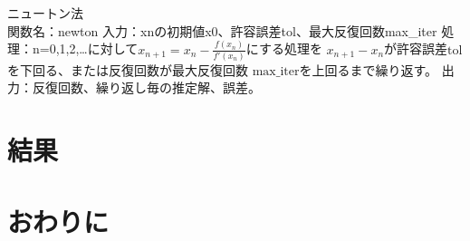 \documentclass[uplatex]{jsarticle}
\begin{document}
ニュートン法\\
関数名：newton 入力：xnの初期値x0、許容誤差tol、最大反復回数max\_iter
処理：n=0,1,2,…に対して\( x_{n+1} = x_n - \frac{f(x_n)}{f'(x_n)} \)にする処理を
\( x_{n+1} - x_n \)が許容誤差\( \text{tol} \)を下回る、または反復回数が最大反復回数
\( \text{max\_iter} \)を上回るまで繰り返す。
出力：反復回数、繰り返し毎の推定解、誤差。



\section{結果}

\section{おわりに}
\end{document}
